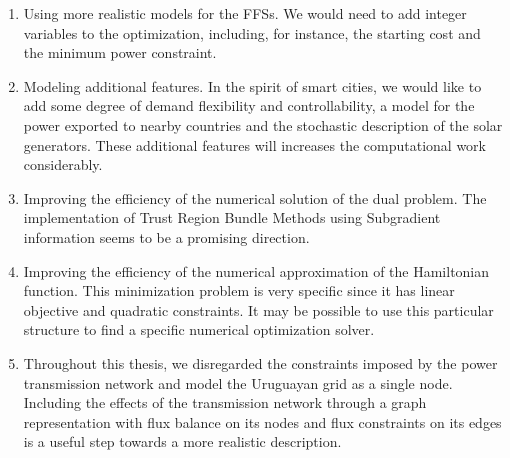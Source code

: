 \begin{enumerate}

\item Using more realistic models for the FFSs. We would need to add integer variables to the optimization, including, for instance, the starting cost and the minimum power constraint.

\item Modeling additional features. In the spirit of smart cities, we would like to add some degree of demand flexibility and controllability, a model for the power exported to nearby countries and the stochastic description of the solar generators. These additional features will increases the computational work considerably.

\item Improving the efficiency of the numerical solution of the dual problem. The implementation of Trust Region Bundle Methods using Subgradient information seems to be a promising direction.

\item Improving the efficiency of the numerical approximation of the Hamiltonian function. This minimization problem is very specific  since it has linear objective and quadratic constraints. It may be possible to use this particular structure to find a specific numerical optimization solver.

\item Throughout this thesis, we disregarded the constraints imposed by the power transmission network and model the Uruguayan grid as a single node. Including the effects of the transmission network through a graph representation with flux balance on its nodes and flux constraints on its edges is a useful step towards a more realistic description.
\end{enumerate}

